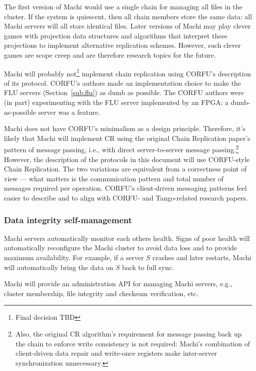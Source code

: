 \documentclass[preprint,10pt]{sigplanconf}
\begin{document}
The first version of Machi would use a single chain for managing all
files in the cluster.  If the system is quiescent,
then all chain members store the same data: all
Machi servers will all store identical files.  Later versions of Machi
may play clever games with projection data structures and algorithms
that interpret these projections to implement alternative replication
schemes.  However, such clever games are scope creep and are therefore
research topics for the future.

Machi will probably not\footnote{Final decision TBD} implement chain
replication using CORFU's description of its protocol.  CORFU's
authors made an implementation choice to make the FLU servers
(Section~\ref{sub:flu}) as dumb as possible.  The CORFU authors were
(in part) experimenting with the FLU server implemented by an FPGA; a
dumb-as-possible server was a feature.

Machi does not have CORFU's minimalism as a design principle.
Therefore, it's likely that Machi will implement CR using the original
Chain Replication \cite{chain-replication} paper's pattern of message
passing, i.e., with direct server-to-server message
passing.\footnote{Also, the original CR algorithm's requirement for
  message passing back up the chain to enforce write consistency is
  not required: Machi's combination of client-driven data repair and
  write-once registers make inter-server synchronization unnecessary.}
However, the
description of the protocols in this document will use CORFU-style
Chain Replication.  The two variations are equivalent from a
correctness point of view --- what matters is the communication
pattern and total number of messages required per operation.
CORFU's
client-driven messaging patterns feel easier to describe and to
align with CORFU- and Tango-related research papers.

\subsubsection{Data integrity self-management}
\label{sub:self-management}

Machi servers automatically monitor each others health.  Signs
of poor health will automatically reconfigure the Machi cluster
to avoid data loss and to provide maximum availability.
For example, if a server $S$ crashes and later
restarts, Machi will automatically bring the data on $S$ back to full sync.

Machi will provide an administration API for managing Machi servers, e.g.,
cluster membership, file integrity and checksum verification, etc.
\end{document}
